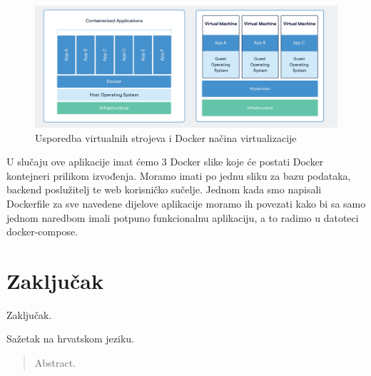 \documentclass[times, utf8, zavrsni]{fer}
\begin{document}
\begin{figure}[htb]
    
    \includegraphics[scale=0.35]{slika2.png}
    \caption{Usporedba virtualnih strojeva i Docker načina virtualizacije}
    \label{fig:korisnik}
    \end{figure}

U slučaju ove aplikacije imat ćemo 3 Docker slike koje će postati Docker kontejneri prilikom izvođenja. Moramo imati po jednu sliku za bazu podataka,
backend poslužitelj te web korisničko sučelje. Jednom kada smo napisali Dockerfile za sve navedene dijelove aplikacije moramo ih povezati kako 
bi sa samo jednom naredbom imali potpuno funkcionalnu aplikaciju, a to radimo u datoteci docker-compose.


        
        


\chapter{Zaključak}
Zaključak.




\begin{sazetak}
Sažetak na hrvatskom jeziku.

\end{sazetak}

\begin{abstract}
Abstract.

\end{abstract}
\end{document}
